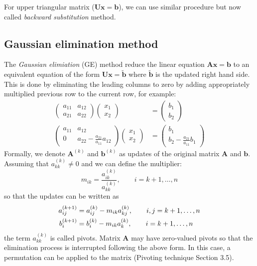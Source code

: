 \documentclass{article}
\begin{document}
For upper triangular matrix ($\mathbf{U}\mathbf{x} = \mathbf{b}$), we can use similar procedure but now called 
\emph{backward substitution} method.

\subsection{Gaussian elimination method}
The \emph{Gaussian elimiation} (GE) method reduce the linear equation 
$\mathbf{A}\mathbf{x} = \mathbf{b}$ to an equivalent equation 
of the form $\mathbf{U}\mathbf{x} = \tilde{\mathbf{b}}$ where $\tilde{\mathbf{b}}$
is the updated right hand side. 
This is done by eliminating the leading columns to zero by adding appropriately multiplied 
previous row to the current row, for example:
\begin{align*}
    \left(\begin{matrix}
        a_{11} & a_{12} \\
        a_{21} & a_{22} 
    \end{matrix}\right)
    \left(\begin{matrix}
        x_1 \\ x_2
    \end{matrix}\right) &= 
    \left(\begin{matrix}
        b_1 \\ b_2
    \end{matrix}\right) \\
    \left(\begin{matrix}
        a_{11} & a_{12} \\
        0 & a_{22} - \frac{a_{21}}{a_{11}} a_{12}
    \end{matrix}\right)
    \left(\begin{matrix}
        x_1 \\ x_2
    \end{matrix}\right) &= 
    \left(\begin{matrix}
        b_1 \\ b_2 - \frac{a_{21}}{a_{11}} b_1
    \end{matrix}\right)
\end{align*}
Formally, we denote $\mathbf{A}^{(k)}$ and $\mathbf{b}^{(k)}$ as updates of the 
original matrix $\mathbf{A}$ and $\mathbf{b}$. Assuming that $a_{kk}^{(k)}\neq 0$ and 
we can define the multiplier:
\begin{equation*}
    m_{ik} = \frac{a_{ik}^{(k)}}{a_{kk}^{(k)}} 
    ,\qquad i = k+1, \dots, n
\end{equation*}
so that the updates can be written as
\begin{align}
    a_{ij}^{(k+1)} &= a_{ij}^{(k)} - m_{ik}a_{kj}^{(k)}
    ,\qquad i,j = k+1, \dots, n \notag \\
    b_{i}^{(k+1)} &= b_{i}^{(k)} - m_{ik}a_{k}^{(k)}
    ,\qquad i = k+1, \dots, n \\
\end{align}
the term $a_{kk}^{(k)}$ is called pivots. Matrix $\mathbf{A}$ may have zero-valued pivots so 
that the elimination process is interrupted following the above form. In this case, a 
permutation can be applied to the matrix (Pivoting technique Section 3.5).
\end{document}
